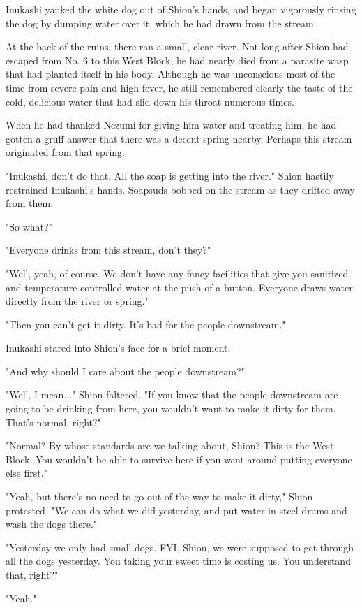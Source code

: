 Inukashi yanked the white dog out of Shion's hands, and began vigorously
rinsing the dog by dumping water over it, which he had drawn from the
stream.

At the back of the ruins, there ran a small, clear river. Not long after
Shion had escaped from No. 6 to this West Block, he had nearly died from
a parasite wasp that had planted itself in his body. Although he was
unconscious most of the time from severe pain and high fever, he still
remembered clearly the taste of the cold, delicious water that had slid
down his throat numerous times.

When he had thanked Nezumi for giving him water and treating him, he had
gotten a gruff answer that there was a decent spring nearby. Perhaps
this stream originated from that spring.

"Inukashi, don't do that. All the soap is getting into the river." Shion
hastily restrained Inukashi's hands. Soapsuds bobbed on the stream as
they drifted away from them.

"So what?"

"Everyone drinks from this stream, don't they?"

"Well, yeah, of course. We don't have any fancy facilities that give you
sanitized and temperature-controlled water at the push of a button.
Everyone draws water directly from the river or spring."

"Then you can't get it dirty. It's bad for the people downstream."

Inukashi stared into Shion's face for a brief moment.

"And why should I care about the people downstream?"

"Well, I mean..." Shion faltered. "If you know that the people
downstream are going to be drinking from here, you wouldn't want to make
it dirty for them. That's normal, right?"

"Normal? By whose standards are we talking about, Shion? This is the
West Block. You wouldn't be able to survive here if you went around
putting everyone else first."

"Yeah, but there's no need to go out of the way to make it dirty," Shion
protested. "We can do what we did yesterday, and put water in steel
drums and wash the dogs there."

"Yesterday we only had small dogs. FYI, Shion, we were supposed to get
through all the dogs yesterday. You taking your sweet time is costing
us. You understand that, right?"

"Yeah."

